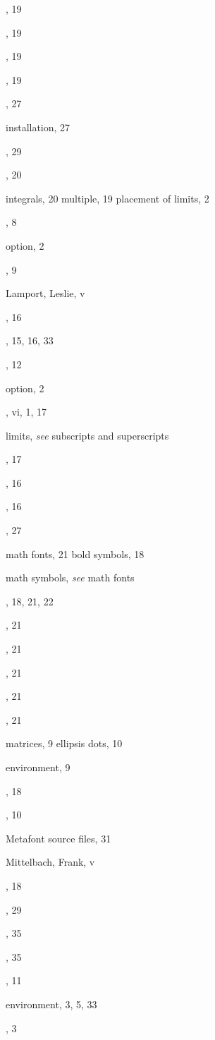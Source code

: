 \documentclass[leqno,titlepage,openany]{amsldoc}
\providecommand{\see}[2]{\textit{see} #1}
\begin{document}
\begin{theindex}
  \indexspace

  \item {}, 19
  \item {}, 19
  \item {}, 19
  \item {}, 19
  \item {}, 27
  \item installation, 27
  \item {}, 29
  \item {}, 20
  \item integrals, 20
    \subitem multiple, 19
    \subitem placement of limits, 2
  \item {}, 8
  \item {} option, 2

  \indexspace

  \item {}, 9
  \item Lamport, Leslie, v
  \item {}, 16
  \item {}, 15, 16, 33
  \item {}, 12
  \item {} option, 2
  \item {}, vi, 1, 17
  \item limits, \see{subscripts and superscripts}{1}
  \item {}, 17
  \item {}, 16
  \item {}, 16

  \indexspace

  \item {}, 27
  \item math fonts, 21
    \subitem bold symbols, 18
  \item math symbols, \see{math fonts}{21}
  \item {}, 18, 21, 22
  \item {}, 21
  \item {}, 21
  \item {}, 21
  \item {}, 21
  \item {}, 21
  \item matrices, 9
    \subitem ellipsis dots, 10
  \item {} environment, 9
  \item {}, 18
  \item {}, 10
  \item Metafont source files, 31
  \item Mittelbach, Frank, v
  \item {}, 18
  \item {}, 29
  \item {}, 35
  \item {}, 35
  \item {}, 11
  \item {} environment, 3, 5, 33
  \item {}, 3


\end{theindex}
\end{document}
